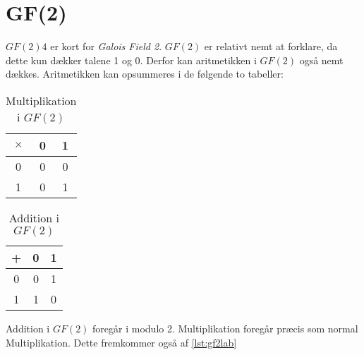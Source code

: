 \section{GF(2)}
$GF(2)4$ er kort for \textit{Galois Field 2}. 
$GF(2)$ er relativt nemt at forklare, da dette kun dækker talene 1 og 0.
Derfor kan aritmetikken i $GF(2)$ også nemt dækkes.
Aritmetikken kan opsummeres i de følgende to tabeller:
\begin{table}[h]
    \centering
    \begin{tabular}{c|cc}
        $\times$&0&1\\\hline
        0&0&0\\
        1&0&1
    \end{tabular}
    \label{tab:fields}
    \caption{Multiplikation i $GF(2)$}
\end{table}
\begin{table}[h]
    \centering
    \begin{tabular}{c|cc}
        +&0&1\\\hline
        0&0&1\\
        1&1&0
    \end{tabular}
    \label{tab:fields}
    \caption{Addition i $GF(2)$}
\end{table}
Addition i $GF(2)$ foregår i modulo 2.
Multiplikation foregår præcis som normal Multiplikation.
Dette fremkommer også af \cref{lst:gf2lab}
